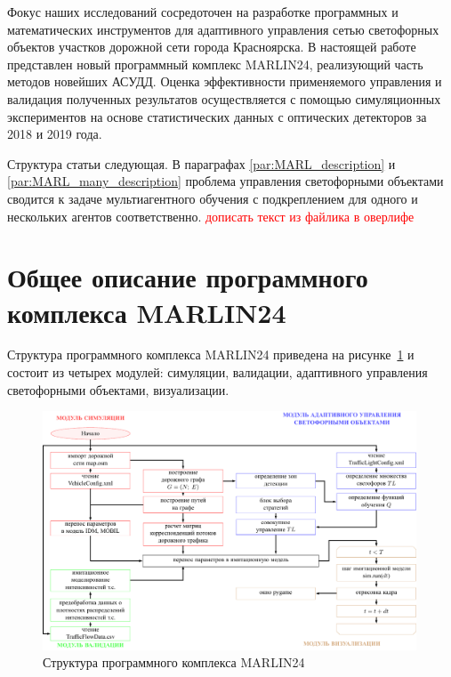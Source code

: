 \documentclass[11pt]{ubs}
\begin{document}




Фокус наших исследований сосредоточен на   разработке программных и математических инструментов для адаптивного управления сетью светофорных объектов участков дорожной сети города Красноярска. 
В настоящей работе представлен новый программный комплекс MARLIN24, реализующий часть методов новейших АСУДД. Оценка эффективности применяемого управления и валидация полученных результатов осуществляется с помощью симуляционных экспериментов на основе статистических данных с оптических детекторов за  2018 и 2019 года. 

Структура статьи следующая. В {параграфах  \ref{par:MARL_description}} и \ref{par:MARL_many_description}
проблема управления 
светофорными объектами сводится к задаче мультиагентного обучения с подкреплением для одного и нескольких агентов соответственно. 
\textcolor{red}{дописать текст из файлика в оверлифе}

\section{Общее описание программного комплекса MARLIN24}

Структура программного комплекса MARLIN24 приведена на рисунке~\ref{fig:structure_MARLIN24} и состоит из четырех модулей:  симуляции,  валидации,  адаптивного управления светофорными объектами, визуализации. 
\begin{figure}[tbph]
  \centering
  \includegraphics[width=0.99\textwidth]{structure.pdf}
  \caption{Структура программного комплекса MARLIN24}\label{fig:structure_MARLIN24}
\end{figure}
\end{document}
